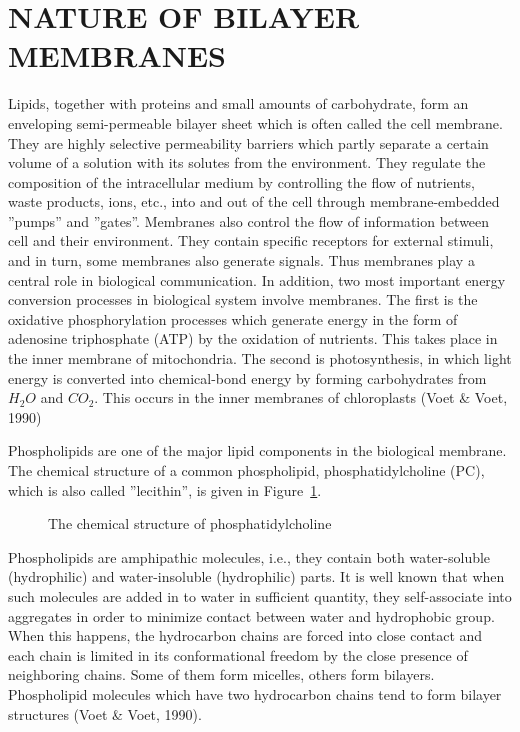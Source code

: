 
%
%

\section{NATURE OF BILAYER MEMBRANES}
Lipids, together with proteins and small amounts of carbohydrate, 
form an enveloping semi-permeable bilayer sheet  which is often
called the cell membrane.
They are highly selective permeability barriers which
partly separate a certain volume of a solution
with its solutes from the environment.
They regulate 
the composition of the intracellular medium by controlling the flow of
nutrients, waste products, ions, etc., into and out of the cell
through membrane-embedded ''pumps'' and ''gates''.
Membranes also control the flow of information
between cell and their environment. They contain specific receptors
for external stimuli, and in turn, some membranes also generate
signals. Thus membranes play a central role in biological
communication.
In addition, two most important energy conversion processes in
biological system involve membranes.
The first is the oxidative phosphorylation processes which generate
energy in the form of adenosine triphosphate (ATP) by the oxidation
of nutrients. This takes place in the inner membrane of
mitochondria.
The second is photosynthesis, in which light energy is converted
into chemical-bond energy by forming carbohydrates from $H_2O$ and
$CO_2$. This occurs in the inner membranes of chloroplasts (Voet \&
Voet, 1990)


Phospholipids are one of the  major lipid components in the
biological membrane. The chemical structure of a common phospholipid,
phosphatidylcholine (PC), which is also called ''lecithin'', is given in
Figure~\ref{fig:dppcmol}. 
\begin{figure}
\label{fig:dppcmol}
\vspace{6.0in}
\caption{The chemical structure of phosphatidylcholine}
\end{figure}
Phospholipids are amphipathic molecules, i.e., they
contain both water-soluble (hydrophilic) and water-insoluble
(hydrophilic) parts. It is well known that when such molecules
are added in to water in sufficient quantity, they self-associate
into aggregates in order to minimize contact between water and
hydrophobic group. When this happens, the
hydrocarbon chains are forced into close contact and each chain is
limited in its conformational freedom by the close presence of
neighboring chains. Some of them form micelles, others form bilayers.
Phospholipid molecules which have two hydrocarbon chains
tend to form bilayer structures (Voet \& Voet, 1990).

